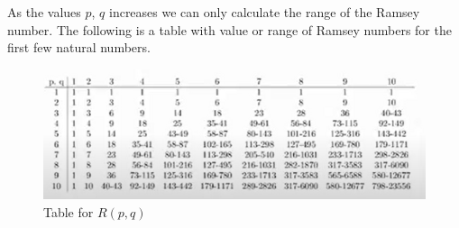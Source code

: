  As the values $p$, $q$ increases we can only calculate the range of the Ramsey number. The following is a table with value or range of Ramsey numbers for the first few natural numbers.
 \begin{figure}[h!]
    \centering
    \includegraphics[width=1\linewidth]{images/RamseyTable.png}
    \caption{Table for $R(p,q)$}
\end{figure}